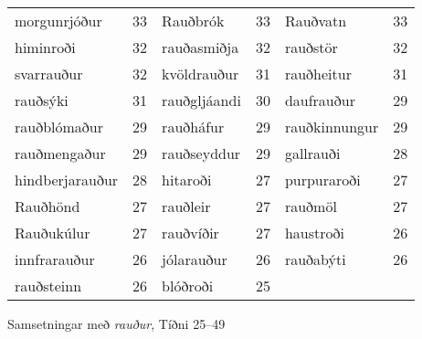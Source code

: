 \documentclass[../samsetningasafn.tex]{subfiles}
\begin{document}
\begin{wordlist}[H]
\begin{tcolorbox}
\begin{tabular}{BlBlBl}
		morgunrjóður	& 33		& 
		Rauðbrók		& 33		& 
		Rauðvatn		& 33		\\ 
		himinroði		& 32		& 	
		rauðasmiðja		& 32		& 
		rauðstör			& 32		\\ 
		svarrauður		& 32		& 	
		kvöldrauður		& 31		& 	
		rauðheitur		& 31		\\ 
		rauðsýki			& 31		& 	
		rauðgljáandi		& 30		& 
		daufrauður		& 29		\\ 	
		rauðblómaður	& 29		& 
		rauðháfur		& 29		& 
		rauðkinnungur	& 29		\\ 	
		rauðmengaður	& 29		& 	
		rauðseyddur		& 29		& 
		gallrauði			& 28		\\ 
		hindberjarauður	& 28		& 	
		hitaroði			& 27		& 	
		purpuraroði		& 27		\\ 	
		Rauðhönd		& 27		& 	
		rauðleir			& 27		& 
		rauðmöl			& 27		\\ 
		Rauðukúlur		& 27		& 	
		rauðvíðir			& 27		& 
		haustroði		& 26		\\ 
		innfrarauður		& 26		& 
		jólarauður		& 26		& 	
		rauðabýti		& 26		\\ 
		rauðsteinn		& 26		& 
		blóðroði			& 25		& 	
						&
	\end{tabular}

\end{tcolorbox}
	\caption{Samsetningar með \textit{rauður}, Tíðni 25--49}
	\label{listi:rautt.25}
\end{wordlist}
\end{document}
